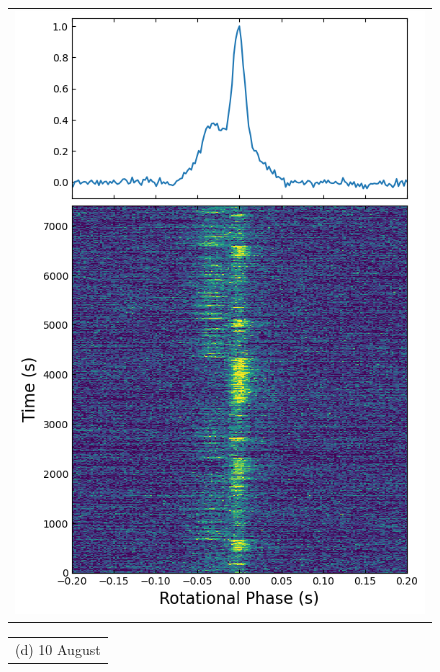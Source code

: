 \documentclass[twocolumn]{emulateapj}
\begin{document}
\begin{figure}[b]
\begin{tabular}[b]{@{}p{}@{}}
	\includegraphics[width=\linewidth]{plots/s-band_Jul15.png}
    \end{tabular}
    \setlength\arrayrulewidth{2pt}
    \begin{tabular}[b]{|@{}p{}@{}}
    \centering\small (d) 10 August

\end{tabular}
\end{figure}
\end{document}
